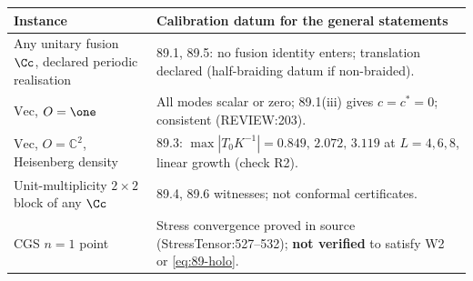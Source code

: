 \begin{center}\footnotesize
\begin{tabular}{p{3.6cm}p{10.4cm}}
\toprule
Instance & Calibration datum for the general statements \\
\midrule
Any unitary fusion \(\Cc\), declared periodic realisation & 89.1, 89.5: no fusion identity enters; translation declared (half-braiding datum if non-braided). \\
\(\mathrm{Vec}\), \(O=\one\) & All modes scalar or zero; 89.1(iii) gives \(c=c^*=0\); consistent (REVIEW:203). \\
\(\mathrm{Vec}\), \(O=\mathbb C^2\), Heisenberg density & 89.3: \(\max|T_0K^{-1}|=0.849,\,2.072,\,3.119\) at \(L=4,6,8\), linear growth (check R2). \\
Unit-multiplicity \(2\times2\) block of any \(\Cc\) & 89.4, 89.6 witnesses; not conformal certificates. \\
CGS \(n=1\) point & Stress convergence proved in source (StressTensor:527--532); \textbf{not verified} to satisfy W2 or \eqref{eq:89-holo}. \\
\bottomrule
\end{tabular}
\end{center}
